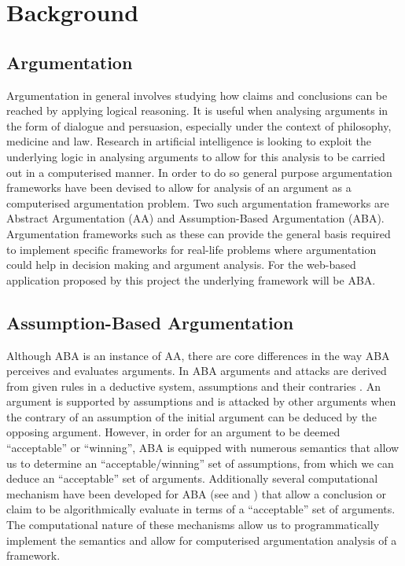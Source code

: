 \newpage
\chapter{Background}

\section{Argumentation}
Argumentation in general involves studying how claims and conclusions can be reached by applying logical reasoning.  It is useful when analysing arguments in the form of dialogue and persuasion, especially under the context of philosophy, medicine and law. Research in artificial intelligence is looking to exploit the underlying logic in analysing arguments to allow for this analysis to be carried out in a computerised manner. In order to do so general purpose argumentation frameworks have been devised to allow for analysis of an argument as a computerised argumentation problem. Two such argumentation frameworks are Abstract Argumentation (AA) and Assumption-Based Argumentation (ABA). Argumentation frameworks such as these can provide the general basis required to implement specific frameworks for real-life problems where argumentation could help in decision making and argument analysis. For the web-based application proposed by this project the underlying framework will be ABA.

\section{Assumption-Based Argumentation}
Although ABA is an instance of AA, there are core differences in the way ABA perceives and evaluates arguments. In ABA arguments and attacks are derived from given rules in a deductive system, assumptions and their contraries \cite{abatut}. An argument is supported by assumptions and is attacked by other arguments when the contrary of an assumption of the initial argument can be deduced by the opposing argument. However, in order for an argument to be deemed ``acceptable'' or ``winning'', ABA is equipped with numerous semantics that allow us to determine an ``acceptable/winning'' set of assumptions, from which we can deduce an ``acceptable'' set of arguments.  Additionally several computational mechanism have been developed for ABA (see \cite{proxdd} and \cite{grapharg}) that allow a conclusion or claim to be algorithmically evaluate in terms of a ``acceptable'' set of arguments. The computational nature of these mechanisms allow us to programmatically implement the semantics and allow for computerised argumentation analysis of a framework.

